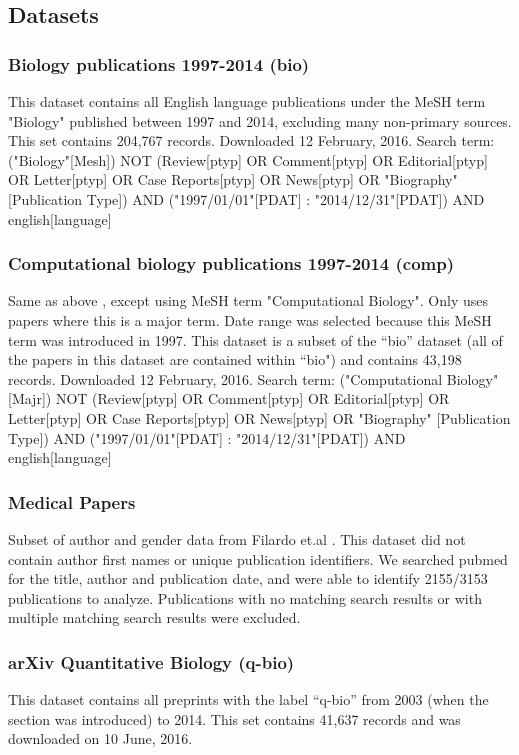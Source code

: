 \documentclass[10pt,letterpaper]{article}
\begin{document}
\begin{flushleft}
\subsection*{Datasets}

\subsubsection*{Biology publications 1997-2014 (bio)}
This dataset \cite{Bonham2016} contains all English language publications under the MeSH term "Biology" published between 1997 and 2014, excluding many non-primary sources. This set contains 204,767 records. Downloaded 12 February, 2016. Search term: ("Biology"[Mesh]) NOT (Review[ptyp] OR Comment[ptyp] OR Editorial[ptyp] OR Letter[ptyp] OR Case Reports[ptyp] OR News[ptyp] OR "Biography" [Publication Type]) AND ("1997/01/01"[PDAT] : "2014/12/31"[PDAT]) AND english[language]

\subsubsection*{Computational biology publications 1997-2014 (comp)}
Same as above \cite{Bonham2016}, except using MeSH term "Computational Biology". Only uses papers where this is a major term. Date range was selected because this MeSH term was introduced in 1997. This dataset is a subset of the “bio” dataset (all of the papers in this dataset are contained within “bio") and contains 43,198 records. Downloaded 12 February, 2016. Search term: ("Computational Biology"[Majr]) NOT (Review[ptyp] OR Comment[ptyp] OR Editorial[ptyp] OR Letter[ptyp] OR Case Reports[ptyp] OR News[ptyp] OR "Biography" [Publication Type]) AND ("1997/01/01"[PDAT] : "2014/12/31"[PDAT]) AND english[language]

\subsubsection*{Medical Papers}
Subset of author and gender data from Filardo et.al \cite{Filardo2016}. This dataset did not contain author first names or unique publication identifiers. We searched pubmed for the title, author and publication date, and were able to identify 2155/3153 publications to analyze. Publications with no matching search results or with multiple matching search results were excluded.

\subsubsection*{arXiv Quantitative Biology (q-bio)}
This dataset \cite{Bonham2016a} contains all preprints with the label “q-bio” from 2003 (when the section was introduced) to 2014. This set contains 41,637 records and was downloaded on 10 June, 2016.


\end{flushleft}
\end{document}
